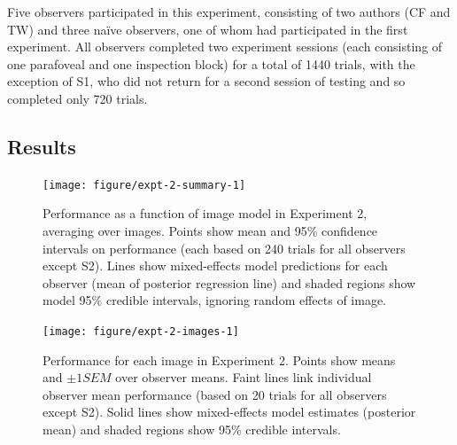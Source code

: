 \documentclass[article, 11pt,a4paper,natbib]{apa6}\usepackage[]{graphicx}\usepackage[]{color}
\newenvironment{knitrout}{}{} %
\begin{document}
Five observers participated in this experiment, consisting of two authors (CF and TW) and three na\"{i}ve observers, one of whom had participated in the first experiment.
All observers completed two experiment sessions (each consisting of one parafoveal and one inspection block) for a total of 1440 trials,  with the exception of S1, who did not return for a second session of testing and so completed only 720 trials.


\subsection{Results}



\begin{knitrout}
\color{fgcolor}\begin{figure}
\texttt{[image: figure/expt-2-summary-1]} \caption[Performance as a function of image model in Experiment 2, averaging over images.
              Points show mean and 95\% confidence intervals on performance (each based on 240 trials for all observers except S2).
              Lines show mixed-effects model predictions for each observer (mean of posterior regression line) and shaded regions show model 95\% credible intervals, ignoring random effects of image]{Performance as a function of image model in Experiment 2, averaging over images.
              Points show mean and 95\% confidence intervals on performance (each based on 240 trials for all observers except S2).
              Lines show mixed-effects model predictions for each observer (mean of posterior regression line) and shaded regions show model 95\% credible intervals, ignoring random effects of image. }\label{fig:expt-2-summary}
\end{figure}


\end{knitrout}



\begin{knitrout}
\color{fgcolor}\begin{figure}
\texttt{[image: figure/expt-2-images-1]} \caption[Performance for each image in Experiment 2.
              Points show means and $\pm 1 SEM$ over observer means.
              Faint lines link individual observer mean performance (based on 20 trials for all observers except S2).
              Solid lines show mixed-effects model estimates (posterior mean) and shaded regions show 95\% credible intervals]{Performance for each image in Experiment 2.
              Points show means and $\pm 1 SEM$ over observer means.
              Faint lines link individual observer mean performance (based on 20 trials for all observers except S2).
              Solid lines show mixed-effects model estimates (posterior mean) and shaded regions show 95\% credible intervals.}\label{fig:expt-2-images}
\end{figure}


\end{knitrout}
\end{document}
